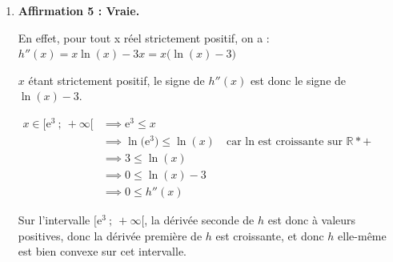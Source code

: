 \documentclass[10pt]{article}
\providecommand{\R}{\mathbb{R}}
\providecommand{\e}{{\mathrm{e}}}
\providecommand{\vect}[1]{\overrightarrow{#1}}
\begin{document}
\begin{enumerate}
	$\mathrm{AC} = \sqrt{1^2 + 0^2 + 1^2} = \sqrt{1 + 0 + 1} = \sqrt{2}$.

	On a donc, avec la définition trigonométrique du produit scalaire :

	$ \vect{\mathrm{AB}}\cdot\vect{\mathrm{AC}} = \mathrm{AB}\times \mathrm{AC}\times \cos\left(\widehat{\mathrm{BAC}}\right) = 2\sqrt{14}\times \sqrt{2} \times \cos\left(\widehat{\mathrm{BAC}}\right) = 4\sqrt{7}\cos\left(\widehat{\mathrm{BAC}}\right)$

	En égalant ces deux expressions du produit scalaire, on déduit :

	$10 = 4\sqrt{7}\cos\left(\widehat{\mathrm{BAC}}\right)$\quad qui équivaut à :\quad $\cos\left(\widehat{\mathrm{BAC}}\right) = \dfrac{10}{4\sqrt{7}} = \dfrac{5\sqrt{7}}{14}$.

	Il se trouve que le cosinus de 30\ensuremath{^\circ}{} est connu, il vaut $\dfrac{\sqrt{3}}{2}$ et est donc différent de celui trouvé ici : l'angle ne mesure dont pas 30\ensuremath{^\circ}.

\textbf{Remarque :} une valeur approchée d'une mesure de l'angle peut être obtenue à la calculatrice :

$\widehat{\mathrm{BAC}} = \arccos\left(\dfrac{5\sqrt{7}}{14}\right)\approx 19$\ensuremath{^\circ}.

\item \textbf{Affirmation 5 : Vraie.}

En effet, pour tout x réel strictement positif, on a :\quad $ h''(x) = x\ln(x) - 3x = x\big(\ln(x) - 3\big)$

$x$ étant strictement positif, le signe de $h''(x)$ est donc le signe de $\ln(x)-3$.

	$\begin{aligned}
		x \in \big[\e^{3}~;~+\infty\big[ &\implies \e^{3} \leqslant x\\
		&\implies \ln\big(\e^{3}\big) \leqslant \ln(x)\quad\text{car ln est croissante sur }\R*+\\
		&\implies 3\leqslant \ln(x)\\
		&\implies 0 \leqslant \ln(x) - 3\\
		&\implies 0\leqslant h''(x)
	\end{aligned}$

	Sur l'intervalle $\big[\e^{3}~;~+\infty\big[$, la dérivée seconde de $h$ est donc à valeurs positives, donc la dérivée première de $h$ est croissante, et donc $h$ elle-même est bien convexe sur cet intervalle.
\end{enumerate}
\end{document}
